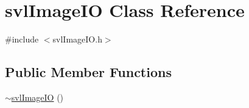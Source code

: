 \hypertarget{classsvl_image_i_o}{\section{svl\-Image\-I\-O Class Reference}
\label{classsvl_image_i_o}
}


{\ttfamily \#include $<$svl\-Image\-I\-O.\-h$>$}

\subsection*{Public Member Functions}
\begin{DoxyCompactItemize}
\item 
\hyperlink{classsvl_image_i_o_a37add86266f1dc348291619e3116efb9}{$\sim$svl\-Image\-I\-O} ()
\end{DoxyCompactItemize}
